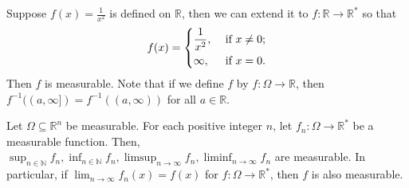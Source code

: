 \begin{eg}
    Suppose \(f(x) = \frac{1}{x^2}\) is defined on \(\mathbb{R}\), then we can extend it to \(f: \mathbb{R} \to \mathbb{R} ^*\) so that 
    \[
        f(x) = \begin{dcases}
            \frac{1}{x^2}, &\text{ if } x \neq 0 ;\\
            \infty , &\text{ if } x = 0.
        \end{dcases}
    \]   
    Then \(f\) is measurable. Note that if we define \(f\) by \(f: \Omega \to \mathbb{R}\), then \(f^{-1} ((a, \infty]) = f^{-1} ((a, \infty))\) for all \(a \in \mathbb{R}\).     
\end{eg}

\begin{lemma} \label{lm: sup, inf, limsup, liminf of measurable func are measurable}
    Let \(\Omega \subseteq \mathbb{R} ^n\) be measurable. For each positive integer \(n\), let \(f_n : \Omega \to \mathbb{R} ^*\) be a measurable function. Then, \(\sup _{n \in \mathbb{N}} f_n, \inf_{n \in \mathbb{N}} f_n, \limsup_{n \to \infty} f_n, \liminf_{n \to \infty} f_n \) are measurable. In particular, if \(\lim_{n \to \infty} f_n(x) = f(x) \) for \(f: \Omega \to \mathbb{R} ^*\), then \(f\) is also measurable.    
\end{lemma}

